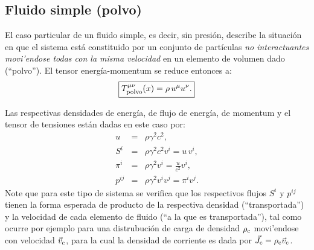 \subsection{Fluido simple (polvo)}

El caso particular de un fluido simple, es decir, sin presión, describe la situación en que el sistema está constituido por  un conjunto de partículas \textit{no interactuantes movi'endose todas con la misma velocidad} en un elemento de volumen dado (``polvo''). El tensor energía-momentum se reduce entonces a:
\begin{equation}
\boxed{T_{\rm polvo}^{\mu\nu}(x)=\rho\, u^\mu u^\nu.}
\end{equation}

Las respectivas densidades de energía, de flujo de energía, de momentum y el
tensor de tensiones están dadas en este caso por:
\begin{eqnarray}
u&=&\rho \gamma^2 c^2, \\ 
S^i&=&\rho \gamma^2c^2v^i=u\,v^i, \\ 
{\pi}^i&=&\rho \gamma^2v^i =\frac{u}{c^2}v^i, \\ 
p^{ij} &=&\rho \gamma^2 v^i v^j=\pi^iv^j.
\end{eqnarray}
Note que para este tipo de sistema se verifica que los respectivos flujos $S^i$ y $p^{ij}$ tienen la forma esperada de producto de la respectiva densidad (``transportada'') y la velocidad de cada elemento de fluido (``a la que es transportada''), tal como ocurre por ejemplo para una distrubución de carga de densidad $\rho_{\rm c}$ movi'endose con velocidad $\vec{v}_{\rm c}$, para la cual la densidad de corriente es dada por $\vec{J}_{\rm c}=\rho_{\rm c}\vec{v}_{\rm c}$.

